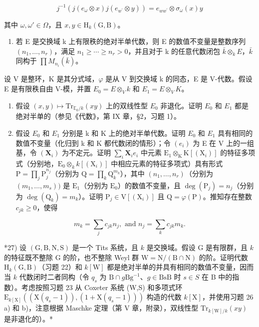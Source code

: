 \[
j ^ {- 1} (j (e _ {\omega} \otimes x) j (e _ {w ^ {\prime}} \otimes y)) = e _ {w w ^ {\prime}} \otimes \sigma_ {\omega} (x) y
\]

其中 \(\omega, \omega' \in \Omega\)，且 \(x, y \in \mathrm{H}_k(\mathrm{G}, \mathrm{B})\)。

\begin{enumerate}
\def\labelenumi{\arabic{enumi})}
\setcounter{enumi}{25}
\tightlist
\item
  若 E 是交换域 k 上有限秩的绝对半单代数，则 E 的数值不变量是整数序列 \((n_{1},\ldots,n_{r})\)，满足 \(n_{1}\geqslant\cdots\geqslant n_{r}>0\)，并且对于 k 的任意代数闭包 \(\bar{k}\otimes_{k}E\)，\(\bar{k}\) 同构于 \(\prod M_{n_{i}}(\bar{k})\)。
\end{enumerate}

设 V 是整环，K 是其分式域，\(\varphi\) 是从 V 到交换域 k 的同态，E 是 V-代数。假设 E 是有限秩自由 V-模，并置 \(E_{0} = E \otimes_{V} k\) 和 \(E_{1} = E \otimes_{V} K\)。

\begin{enumerate}
\def\labelenumi{\alph{enumi})}
\item
  假设 \((x,y)\mapsto\mathrm{Tr}_{\mathbb{E}_{0}/k}(xy)\) 上的双线性型 \(E_{0}\) 非退化。证明 \(E_{0}\) 和 \(E_{1}\) 都是绝对半单的（参见《代数》，第 IX 章，§2，习题 1）。
\item
  假设 \(E_{0}\) 和 \(E_{1}\) 分别是 k 和 K 上的绝对半单代数。证明 \(E_{0}\) 和 \(E_{1}\) 具有相同的数值不变量（化归到 k 和 K 都代数闭的情形）；令 \((e_{i})\) 为 E 在 V 上的一组基，令 \((\mathbf{X}_i)\) 为不定元。证明 \(\sum_{i}\mathbf{X}_{i}e_{i}\) 中元素 \(\mathrm{E}_1\otimes_{\mathrm{K}}\mathrm{K}[(\mathrm{X}_i)]\) 的特征多项式（分别地，\(\mathrm{E}_0\otimes_kk[(\mathrm{X}_i)]\) 中相应元素的特征多项式）具有形式 \(\mathrm{P} = \prod_j\mathrm{P}_j^{n_j}\)（分别为 \(\mathrm{Q} = \prod_k\mathrm{Q}_k^{m_k}\)），其中 \((n_1,\ldots ,n_r)\)（分别为 \((m_1,\dots ,m_s))\) 是 \(\mathrm{E}_1\)（分别为 \(\mathrm{E}_0\)）的数值不变量，且 \(\deg (\mathrm{P}_j) = n_j\)（分别为 \(\deg (\mathrm{Q}_k) = m_k\)）。证明 \(\mathrm{P}_j\in \mathrm{V}[(\mathrm{X}_i)]\) 且 \(\mathrm{Q} = \varphi (\mathrm{P})\)。推知存在整数 \(c_{jk}\geqslant 0\)，使得
\end{enumerate}

\[
m _ {k} = \sum_ {j} c _ {j k} n _ {j}, \text { and } n _ {j} = \sum_ {k} c _ {j k} m _ {k}.
\]

*27) 设 \((\mathrm{G},\mathrm{B},\mathrm{N},\mathrm{S})\) 是一个 Tits 系统，且 \(k\) 是交换域。假设 G 是有限群，且 \(k\) 的特征既不整除 G 的阶，也不整除 Weyl 群 \(\mathrm{W} = \mathrm{N} / (\mathrm{B}\cap \mathrm{N})\) 的阶。证明代数 \(\mathrm{H}_k(\mathrm{G},\mathrm{B})\)（习题 22）和 \(k[\mathrm{W}]\) 都是绝对半单的并具有相同的数值不变量，因而当 \(k\) 代数闭时二者同构（令 \(q_{s}\) 为 \(\mathrm{B}\cap g\mathrm{Bg}^{-1}\)、\(g\in \mathrm{BsB}\) 时 \(s\in S\) 在 B 中的指数）。考虑按照习题 23 从 Coxeter 系统 (W,S) 和多项式环 \(\mathrm{E}_{k[\mathrm{X}]}((\mathrm{X}(q_s - 1)),(1 + \mathrm{X}(q_s - 1)))\) 构造的代数 \(k[\mathrm{X}]\)，并使用习题 26 a) 和 b)，注意根据 Maschke 定理（第 V 章，附录），双线性型 \(\mathrm{Tr}_{k[\mathrm{W}] / k}(xy)\) 是非退化的）。*

